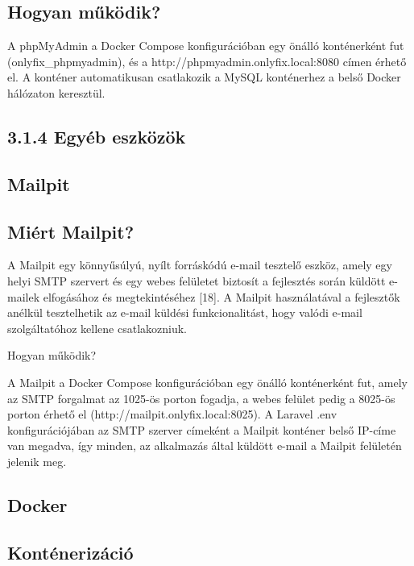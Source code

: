 \subsection{Hogyan működik?}\label{hogyan-mux171kuxf6dik-3}

A phpMyAdmin a Docker Compose konfigurációban egy önálló konténerként fut (onlyfix\_phpmyadmin), és a http://phpmyadmin.onlyfix.local:8080 címen érhető el. A konténer automatikusan csatlakozik a MySQL konténerhez a belső Docker hálózaton keresztül.

\subsection{3.1.4 Egyéb eszközök}\label{egyuxe9b-eszkuxf6zuxf6k}

\subsection{Mailpit}\label{mailpit}

\subsection{Miért Mailpit?}\label{miuxe9rt-mailpit}

A Mailpit egy könnyűsúlyú, nyílt forráskódú e-mail tesztelő eszköz, amely egy helyi SMTP szervert és egy webes felületet biztosít a fejlesztés során küldött e-mailek elfogásához és megtekintéséhez {[}18{]}. A Mailpit használatával a fejlesztők anélkül tesztelhetik az e-mail küldési funkcionalitást, hogy valódi e-mail szolgáltatóhoz kellene csatlakozniuk.

Hogyan működik?

A Mailpit a Docker Compose konfigurációban egy önálló konténerként fut, amely az SMTP forgalmat az 1025-ös porton fogadja, a webes felület pedig a 8025-ös porton érhető el (http://mailpit.onlyfix.local:8025). A Laravel .env konfigurációjában az SMTP szerver címeként a Mailpit konténer belső IP-címe van megadva, így minden, az alkalmazás által küldött e-mail a Mailpit felületén jelenik meg.

\subsection{Docker}\label{docker}

\subsection{Konténerizáció}\label{kontuxe9nerizuxe1ciuxf3}

